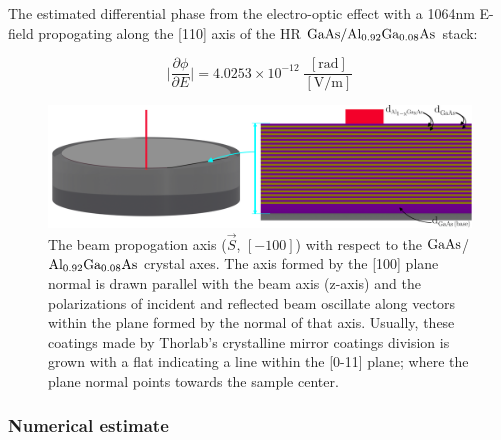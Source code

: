 The estimated differential phase from the electro-optic effect with a 1064nm E-field propogating along the [110] axis of the HR $\mathrm{GaAs} / \mathrm{Al_{0.92}Ga_{0.08}As}$ stack:

$$
\bigg| \frac{\partial \phi}{\partial E} \bigg| = 4.0253 \times 10^{-12} \; \frac{[\mathrm{rad}]}{[\mathrm{V}/\mathrm{m}]}
$$



\begin{figure}[!ht]
	\includegraphics[width=\textwidth]{figs/ALGAAS/ALGAAS_HR_layers_ann.pdf}
\caption{The beam propogation axis ($\vec{S}$, $[-100]$) with respect to the $\mathrm{GaAs}$/$\mathrm{Al_{0.92}Ga_{0.08}As}$ crystal axes. The axis formed by the [100] plane normal is drawn parallel with the beam axis (z-axis) and the polarizations of incident and reflected beam oscillate along vectors within the plane formed by the normal of that axis. Usually, these coatings made by Thorlab's crystalline mirror coatings division is grown with a flat indicating a line within the [0-11] plane; where the plane normal points towards the sample center.}
\label{fig:HRlayers}
\end{figure}


\subsubsection*{Numerical estimate}\label{algaas_numericalestimate}

